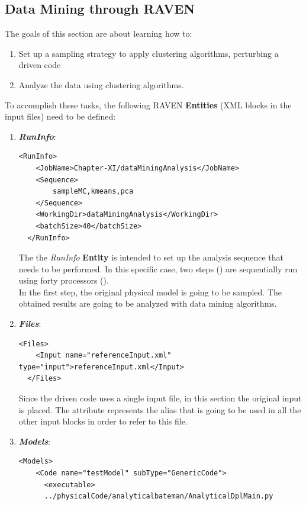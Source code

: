 \subsection{Data Mining through RAVEN}
\label{subsub:DMraven}
The goals of this section are about learning how to:
 \begin{enumerate}
   \item Set up a sampling strategy to apply clustering algorithms, perturbing a driven code
  \item Analyze the data using clustering algorithms.
\end{enumerate}  
To accomplish these tasks, the following RAVEN \textbf{Entities} (XML blocks in the input files) need to be defined:
\begin{enumerate}
   \item \textbf{\textit{RunInfo}}:
\begin{lstlisting}[style=XML,morekeywords={arg,extension,pauseAtEnd,overwrite}]
  <RunInfo>
    <JobName>Chapter-XI/dataMiningAnalysis</JobName>
    <Sequence>
        sampleMC,kmeans,pca
    </Sequence>
    <WorkingDir>dataMiningAnalysis</WorkingDir>
    <batchSize>40</batchSize>
  </RunInfo>
\end{lstlisting}
   The the \textit{RunInfo} \textbf{Entity} is intended  to set up the analysis sequence that
   needs to be performed. In this specific case, two steps  () are sequentially run 
   using forty processors (). 
   \\In the first step, the original physical model is going to be sampled. 
   The obtained results are going to be analyzed with data mining 
   algorithms. 
   \item \textbf{\textit{Files}}:
\begin{lstlisting}[style=XML,morekeywords={arg,extension,pauseAtEnd,overwrite}]
  <Files>
    <Input name="referenceInput.xml" type="input">referenceInput.xml</Input>
  </Files>
\end{lstlisting}
   Since the driven code uses a single input file, in this section the original input is placed. The attribute   represents the alias that is going to be 
   used in all the other input blocks in order to refer to this file. 
   \item \textbf{\textit{Models}}:
\begin{lstlisting}[style=XML,morekeywords={arg,extension,pauseAtEnd,overwrite}]
  <Models>
    <Code name="testModel" subType="GenericCode">
      <executable>
      ../physicalCode/analyticalbateman/AnalyticalDplMain.py

\end{lstlisting}
\end{enumerate}
